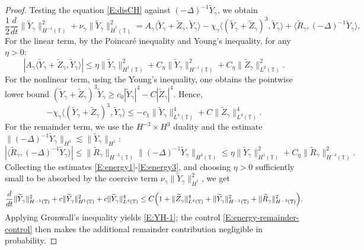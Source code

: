 \documentclass{article}
\begin{document}
\begin{proof}
Testing the equation \eqref{E:disCH} against \( (-\Delta)^{-1} \widetilde Y_\gamma\), we obtain
\[
\frac12 \frac{d}{dt}\|\widetilde Y_\gamma\|_{H^{-1}(\mathbb T)}^2
+
\nu_{\gamma}\| \widetilde Y_\gamma\|_{\dot{H}^{1}(\mathbb T)}^2
=
A_\gamma\langle \widetilde Y_\gamma+ \widetilde Z_\gamma, \widetilde Y_\gamma\rangle
- \chi_{\gamma}\langle (\widetilde Y_\gamma+ \widetilde Z_\gamma)^3, \widetilde Y_\gamma\rangle
+
\langle \widetilde R_\gamma, (-\Delta)^{-1} \widetilde Y_\gamma\rangle.
\]
For the linear term, by the Poincar\'e inequality and Young's inequality, for any $\eta > 0$:
\begin{equation}\label{E:energy1}
    |A_\gamma\langle \widetilde Y_\gamma+ \widetilde Z_\gamma, \widetilde Y_\gamma\rangle|
\le
\eta\|\widetilde Y_\gamma\|_{H^{1}(\mathbb T)}^2
+
C_\eta\|\widetilde Y_\gamma\|_{H^{-1}(\mathbb T)}^2
+
C_\eta\|\widetilde Z_\gamma\|_{L^2(\mathbb T)}^2.
\end{equation}
For the nonlinear term, using the Young's inequality, one obtains the pointwise lower bound \((\widetilde Y_\gamma+\widetilde Z_\gamma)^3 \widetilde Y_\gamma \ge c_0|\widetilde Y_\gamma|^4-C|\widetilde Z_\gamma|^4\). Hence,
\begin{equation}\label{E:energy2}
    -\chi_{\gamma}\langle (\widetilde Y_\gamma+ \widetilde Z_\gamma)^3, \widetilde Y_\gamma\rangle
\le
-c_1\|\widetilde Y_\gamma\|_{L^4(\mathbb T)}^4 + C\|\widetilde Z_\gamma\|_{L^4(\mathbb T)}^4.
\end{equation}
For the remainder term, we use the \(H^{-3}\times H^3\) duality and the estimate
\(\|(-\Delta)^{-1}\widetilde Y_\gamma\|_{H^3}
\lesssim \|\widetilde Y_\gamma\|_{H^1}\):
\begin{equation}\label{E:energy3}
    |\langle \widetilde R_\gamma,(-\Delta)^{-1}\widetilde Y_\gamma\rangle|
\le
\|\widetilde R_\gamma\|_{H^{-3}(\mathbb T)} \|(-\Delta)^{-1}\widetilde Y_\gamma\|_{H^3(\mathbb T)}
\le
\eta \|\widetilde Y_\gamma\|_{H^{1}(\mathbb T)}^2
+ C_\eta \|\widetilde R_\gamma\|_{H^{-3}(\mathbb T)}^2.
\end{equation}
Collecting the estimates \eqref{E:energy1}-\eqref{E:energy3}, and choosing \(\eta>0\) sufficiently small to be absorbed by the coercive term \(\nu_\gamma\|\widetilde Y_\gamma\|_{\dot{H}^{1}}^2\), we get
\[
\frac{d}{dt}\|\widetilde Y_\gamma\|_{H^{-1}(\mathbb T)}^2
+
c\|\widetilde Y_\gamma\|_{H^1(\mathbb T)}^2
+
c\|\widetilde Y_\gamma\|_{L^4(\mathbb T)}^4
\le
C\Bigl(
1+\|\widetilde Z_\gamma\|_{L^4(\mathbb T)}^4+\|\widetilde Y_\gamma\|_{H^{-1}(\mathbb T)}^2 + \|\widetilde R_\gamma\|_{H^{-3}(\mathbb T)}^2
\Bigr).
\]
Applying Gronwall's inequality yields \eqref{E:YH-1}; the control
\eqref{E:energy-remainder-control} then makes the additional remainder contribution
negligible in probability.


\end{proof}
\end{document}
